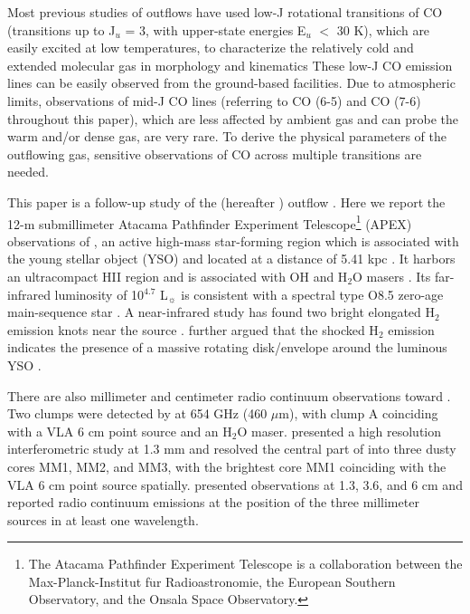 Most previous studies of outflows have used low-J rotational transitions of CO (transitions up to J$_u$ = 3, with upper-state energies E$_u$ $<$ 30 K), which are easily excited at low temperatures, to characterize the relatively cold and extended molecular gas in morphology and kinematics  These low-J CO emission lines can be easily observed from the ground-based facilities. Due to atmospheric limits, observations of mid-J CO lines (referring to CO (6-5) and CO (7-6) throughout this paper), which are less affected by ambient gas and can probe the warm and/or dense gas, are very rare. To derive the physical parameters of the outflowing gas, sensitive observations of CO across multiple transitions are needed. 


This paper is a follow-up study of the  (hereafter ) outflow \citep{2009ApJ...696...66Q}. Here we report the 12-m submillimeter Atacama Pathfinder Experiment Telescope\footnote{    The Atacama Pathfinder Experiment Telescope is a collaboration between the Max-Planck-Institut f$\ddot{\mathrm{u}}$r Radioastronomie, the European Southern Observatory, and the Onsala Space Observatory.} (APEX) observations of , an active high-mass star-forming region which is associated with the young stellar object (YSO)  and located at a distance of 5.41 kpc \citep{2015PASJ...67...69S}. It harbors an ultracompact HII region and is associated with OH and H$_2$O masers \citep{1993AJ....105.1495H,1997MNRAS.289..203C,1998AJ....116.1897M,1999ApJS..123..487M,2003MNRAS.341..551C}. Its far-infrared luminosity of 10$^{4.7}$ L$_\sun$ is consistent with a spectral type O8.5 zero-age main-sequence star \citep{1998AJ....116.1897M}. A near-infrared study has found two bright elongated H$_2$ emission knots near the source \citep{2002ApJ...576..313K}. \citet{2003A&A...412..175K} further argued that the shocked H$_2$ emission indicates the presence of a massive rotating disk/envelope around the luminous YSO . 

There are also millimeter and centimeter radio continuum observations toward . Two clumps were detected by \citet{2007ApJ...654L..87C} at 654 GHz (460 $\mu$m), with clump A coinciding with a VLA 6 cm point source \citep{1993AJ....105.1495H} and an H$_2$O maser. \citet{2009ApJ...696...66Q} presented a high resolution interferometric study at 1.3 mm and resolved the central part of  into three dusty cores MM1, MM2, and MM3, with the brightest core MM1 coinciding with the VLA 6 cm point source spatially. \citet{2011AJ....142..147T} presented observations at 1.3, 3.6, and 6 cm and reported radio continuum emissions at the position of the three millimeter sources in at least one wavelength.

